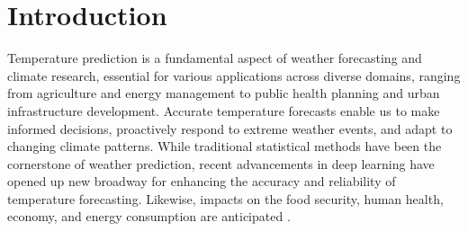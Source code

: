 \documentclass[sn-mathphys,Numbered]{sn-jnl}
\theoremstyle{thmstyleone}
\theoremstyle{thmstyletwo}
\theoremstyle{thmstylethree}
\begin{document}



\maketitle

\section{Introduction}\label{sec1}

Temperature prediction is a fundamental aspect of weather forecasting and climate research, essential for various applications across diverse domains, ranging from agriculture and energy management to public health planning and urban infrastructure development. Accurate temperature forecasts enable us to make informed decisions, proactively respond to extreme weather events, and adapt to changing climate patterns. While traditional statistical methods have been the cornerstone of weather prediction, recent advancements in deep learning have opened up new broadway for enhancing the accuracy and reliability of temperature forecasting. Likewise, impacts on the food security, human health, economy, and energy consumption are anticipated \cite{cifuentes2020air}.
\end{document}
